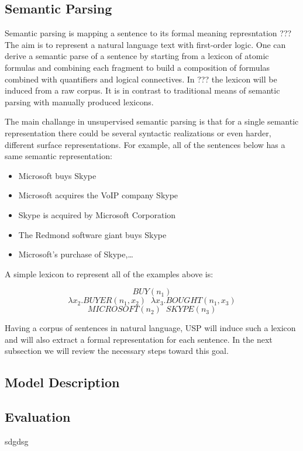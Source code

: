 \documentclass[12pt]{report}
\begin{document}
\subsection{Semantic Parsing}
\label{ch:definition}

Semantic parsing is mapping a sentence to its formal meaning represntation ???%
The aim is to represent a natural language text with first-order logic. One can derive a semantic parse of a sentence
by starting from a lexicon of atomic formulas and combining each fragment to build a composition of 
formulas combined with quantifiers and logical connectives. In ???%
 the lexicon will be induced from a raw corpus. It is in contrast to traditional means of semantic parsing with manually
  produced lexicons.
  
  The main challange in unsupervised semantic parsing is that for a single semantic representation there could be
  several syntactic realizations or even harder, different surface representations. For example, all of the
   sentences below has a same semantic representation:
   \begin{itemize}
     \item Microsoft buys Skype
     \item Microsoft acquires the VoIP company Skype
     \item Skype is acquired by Microsoft Corporation
     \item The Redmond software giant buys Skype
     \item Microsoft’s purchase of Skype,\ldots
   \end{itemize}  
  
   A simple lexicon to represent all of the examples above is:
  
   $$ BUY(n_1)$$
   $$ \lambda x_2.BUYER(n_1 , x_2) \; \;  \lambda x_3.BOUGHT(n_1 , x_3) $$
   $$ MICROSOFT(n_2) \; \; SKYPE(n_3)$$
   
   Having a corpus of sentences in natural language, USP %
    will induce such a lexicon and will also extract a formal representation for each sentence. In the next 
    subsection we will review the necessary steps toward this goal.
\subsection{Model Description}
\label{ch:model}


\subsection {Evaluation}
\label{ch:evaluation}
sdgdsg
\end{document}
